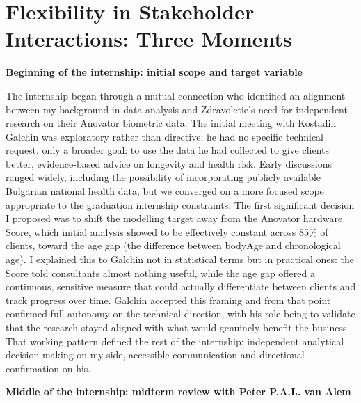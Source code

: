 \documentclass[11pt,a4paper]{report}
\begin{document}
\section{Flexibility in Stakeholder Interactions: Three Moments}

\textbf{Beginning of the internship: initial scope and target variable}

The internship began through a mutual connection who identified an alignment between my background
in data analysis and Zdravoletie's need for independent research on their Anovator biometric data.
The initial meeting with Kostadin Galchin was exploratory rather than directive; he had no specific
technical request, only a broader goal: to use the data he had collected to give clients better,
evidence-based advice on longevity and health risk. Early discussions ranged widely, including the
possibility of incorporating publicly available Bulgarian national health data, but we converged on
a more focused scope appropriate to the graduation internship constraints. The first significant
decision I proposed was to shift the modelling target away from the Anovator hardware Score, which
initial analysis showed to be effectively constant across 85\% of clients, toward the age gap (the
difference between bodyAge and chronological age). I explained this to Galchin not in statistical
terms but in practical ones: the Score told consultants almost nothing useful, while the age gap
offered a continuous, sensitive measure that could actually differentiate between clients and track
progress over time. Galchin accepted this framing and from that point confirmed full autonomy on
the technical direction, with his role being to validate that the research stayed aligned with what
would genuinely benefit the business. That working pattern defined the rest of the internship:
independent analytical decision-making on my side, accessible communication and directional
confirmation on his.

\textbf{Middle of the internship: midterm review with Peter P.A.L. van Alem}
\end{document}
